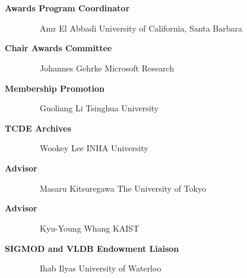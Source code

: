 \documentclass[10pt,twocolumn]{article}
\begin{document}
\begin{description}
\item[{\bf Awards Program Coordinator}]
\verb-  -                      \newline
Amr El Abbadi \newline
University of California, Santa Barbara \newline
\vspace{-.4cm}

\item[{\bf Chair Awards Committee}]
\verb-  -                      \newline
Johannes Gehrke \newline
Microsoft Research \newline
\vspace{-.4cm}

\item[{\bf Membership Promotion}]
\verb-  -                      \newline
Guoliang Li     \newline
Tsinghua University	\newline
\vspace{-.4cm}

\item[{\bf TCDE Archives}]
\verb-  -                      \newline
Wookey Lee\newline
INHA University \newline
\vspace{-.4cm}

\item[{\bf Advisor}]
\verb-  -                      \newline
Masaru Kitsuregawa 				\newline
The University of Tokyo	\newline
\vspace{-.4cm}

\item[{\bf Advisor}]
\verb-  -                      \newline
Kyu-Young Whang 				\newline
KAIST	\newline
\vspace{-.4cm}

\item[{\bf SIGMOD and VLDB Endowment Liaison}]
\verb-  -                      \newline
Ihab Ilyas \newline
University of Waterloo \newline
\verb-  -                      \newline
\end{description}
\end{document}
